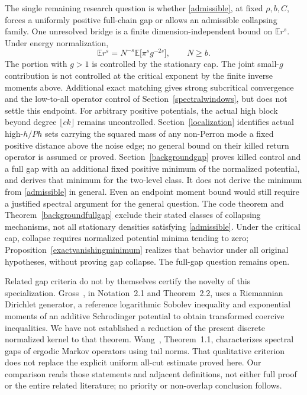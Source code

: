 \documentclass[11pt]{article}
\newcommand{\E}{\mathbb E}
\begin{document}
The single remaining research question is whether \eqref{admissible}, at fixed $\rho,b,C$, forces a uniformly positive full-chain gap or allows an admissible collapsing family. One unresolved bridge is a finite dimension-independent bound on $\E r^s$. Under energy normalization,
\[
 \E r^s=N^{-s}\E\bigl[\pi^s g^{-2s}\bigr],\qquad N\geq b.
\]
The portion with $g>1$ is controlled by the stationary cap. The joint small-$g$ contribution is not controlled at the critical exponent by the finite inverse moments above. Additional exact matching gives strong subcritical convergence and the low-to-all operator control of Section~\ref{spectralwindows}, but does not settle this endpoint. For arbitrary positive potentials, the actual high block beyond degree $\lfloor ck\rfloor$ remains uncontrolled. Section~\ref{localization} identifies actual high-$h/Ph$ sets carrying the squared mass of any non-Perron mode a fixed positive distance above the noise edge; no general bound on their killed return operator is assumed or proved. Section~\ref{backgroundgap} proves killed control and a full gap with an additional fixed positive minimum of the normalized potential, and derives that minimum for the two-level class. It does not derive the minimum from \eqref{admissible} in general. Even an endpoint moment bound would still require a justified spectral argument for the general question. The code theorem and Theorem~\ref{backgroundfullgap} exclude their stated classes of collapsing mechanisms, not all stationary densities satisfying \eqref{admissible}. Under the critical cap, collapse requires normalized potential minima tending to zero; Proposition~\ref{exactvanishingminimum} realizes that behavior under all original hypotheses, without proving gap collapse. The full-gap question remains open.

Related gap criteria do not by themselves certify the novelty of this
specialization. Gross~\cite{gross2025}, in Notation~2.1 and Theorem~2.2,
uses a Riemannian Dirichlet generator, a reference logarithmic Sobolev
inequality and exponential moments of an additive Schrodinger potential
to obtain transformed coercive inequalities. We have not established a
reduction of the present discrete normalized kernel to that theorem.
Wang~\cite{wang2013}, Theorem~1.1, characterizes spectral gaps of ergodic
Markov operators using tail norms. That qualitative criterion does not
replace the explicit uniform all-cut estimate proved here. Our comparison
reads those statements and adjacent definitions, not either full proof or
the entire related literature; no priority or non-overlap conclusion follows.
\end{document}
